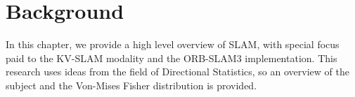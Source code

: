 \section{Background}
\label{sec:background}

In this chapter, we provide a high level overview of SLAM, with special focus paid to the KV-SLAM modality and the ORB-SLAM3 implementation. This research uses ideas from the field of Directional Statistics, so an overview of the subject and the Von-Mises Fisher distribution is provided.






